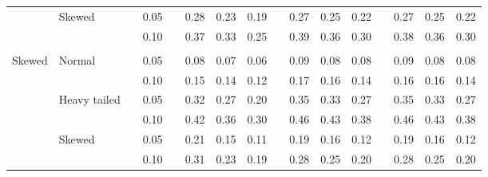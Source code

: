 \documentclass[11pt]{article} %
\begin{document}
\begin{table}[ht]
\begin{scriptsize}
\begin{center}
\begin{tabular}{ll p{.1cm} c p{.1cm} rrr p{.1cm} rrr p{.1cm} rrr}
             & Skewed       && 0.05 &&   0.28 & 0.23 & 0.19 && 0.27 & 0.25 & 0.22 && 0.27 & 0.25 & 0.22 \\ 
             &              && 0.10 &&   0.37 & 0.33 & 0.25 && 0.39 & 0.36 & 0.30 && 0.38 & 0.36 & 0.30 \\
             &&&&&&&&&&&&&&&\\ 
Skewed       & Normal       && 0.05 &&   0.08 & 0.07 & 0.06 && 0.09 & 0.08 & 0.08 && 0.09 & 0.08 & 0.08 \\ 
             &              && 0.10 &&   0.15 & 0.14 & 0.12 && 0.17 & 0.16 & 0.14 && 0.16 & 0.16 & 0.14 \\ 
             & Heavy tailed && 0.05 &&   0.32 & 0.27 & 0.20 && 0.35 & 0.33 & 0.27 && 0.35 & 0.33 & 0.27 \\ 
             &              && 0.10 &&   0.42 & 0.36 & 0.30 && 0.46 & 0.43 & 0.38 && 0.46 & 0.43 & 0.38 \\ 
             & Skewed       && 0.05 &&   0.21 & 0.15 & 0.11 && 0.19 & 0.16 & 0.12 && 0.19 & 0.16 & 0.12 \\ 
             &              && 0.10 &&   0.31 & 0.23 & 0.19 && 0.28 & 0.25 & 0.20 && 0.28 & 0.25 & 0.20 \\ 



\end{tabular}
\end{center}
\end{scriptsize}
\end{table}
\end{document}
